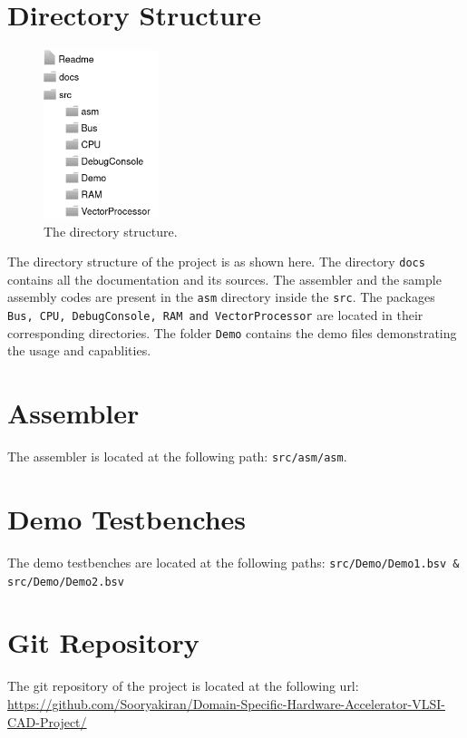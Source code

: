 \begin{paper}
\renewcommand*{\pagemark}{}

\section*{Directory Structure\sdot}
\begin{figure}
\centering
\includegraphics[width=0.3\textwidth]{Images/Overview-Dir.png}
\caption{\content The directory structure.}

\end{figure}

The directory structure of the project is as shown here. The directory \texttt{docs} contains all the documentation and its sources. The assembler and the sample assembly codes are present in the \texttt{asm} directory inside the \texttt{src}. The packages \texttt{Bus, CPU, DebugConsole, RAM and VectorProcessor} are located in their corresponding directories. The folder \texttt{Demo} contains the demo files demonstrating the usage and capablities.

\section*{Assembler\sdot} 
The assembler is located at the following path: \texttt{src/asm/asm}.

\section*{Demo Testbenches\sdot}
The demo testbenches are located at the following paths: \texttt{src/Demo/Demo1.bsv \& src/Demo/Demo2.bsv}

\section*{Git Repository\sdot}
The git repository of the project is located at the following url:\\ {\color{RubineRed}\url{https://github.com/Sooryakiran/Domain-Specific-Hardware-Accelerator-VLSI-CAD-Project/}}
\end{paper}


